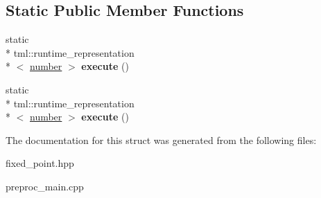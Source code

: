 \subsection*{Static Public Member Functions}
\begin{DoxyCompactItemize}
\item 
\hypertarget{structtml_1_1impl_1_1to__runtime_3_01tml_1_1fixed__point_3_01INTEGER__T_00_01V_01_4_01_4_aa4fe23243936c20f2a43dbe46a54d74f}{static \\*
tml\+::runtime\+\_\+representation\\*
$<$ \hyperlink{structtml_1_1fixed__point}{number} $>$ {\bfseries execute} ()}\label{structtml_1_1impl_1_1to__runtime_3_01tml_1_1fixed__point_3_01INTEGER__T_00_01V_01_4_01_4_aa4fe23243936c20f2a43dbe46a54d74f}

\item 
\hypertarget{structtml_1_1impl_1_1to__runtime_3_01tml_1_1fixed__point_3_01INTEGER__T_00_01V_01_4_01_4_aa4fe23243936c20f2a43dbe46a54d74f}{static \\*
tml\+::runtime\+\_\+representation\\*
$<$ \hyperlink{structtml_1_1fixed__point}{number} $>$ {\bfseries execute} ()}\label{structtml_1_1impl_1_1to__runtime_3_01tml_1_1fixed__point_3_01INTEGER__T_00_01V_01_4_01_4_aa4fe23243936c20f2a43dbe46a54d74f}

\end{DoxyCompactItemize}


The documentation for this struct was generated from the following files\+:\begin{DoxyCompactItemize}
\item 
fixed\+\_\+point.\+hpp\item 
preproc\+\_\+main.\+cpp\end{DoxyCompactItemize}
